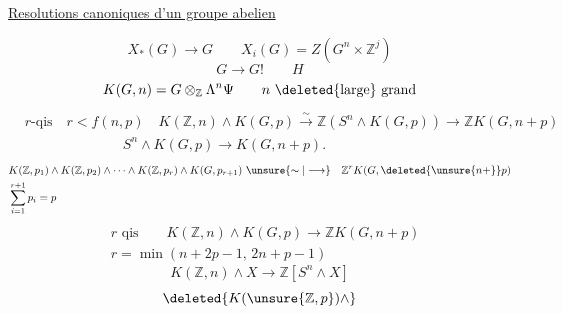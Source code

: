 \uline{Resolutions canoniques d'un groupe abelien}

\[
X_*(G)\longrightarrow G\qquad X_i(G)=Z(G^n\times\mathbb Z^j)
\]
\[
G\to G!\qquad H
\]
\[
K(G,n)=G\otimes_{\mathbb Z}\Lambda^n\Psi\qquad n\ \deleted{\text{large}}\ \text{grand}
\]
\[
\begin{aligned}
&r\text{-qis}\quad r<f(n,p)\quad K(\mathbb Z,n)\wedge K(G,p)\xrightarrow{\sim}\mathbb Z(S^n\wedge K(G,p))\longrightarrow\mathbb Z K(G,n+p)\\
&\hspace{7em} S^n\wedge K(G,p)\longrightarrow K(G,n+p).
\end{aligned}
\]
\[
\begin{aligned}
&K(\mathbb Z,p_1)\wedge K(\mathbb Z,p_2)\wedge\cdots\wedge K(\mathbb Z,p_r)\wedge K(G,p_{r+1})\ \unsure{\sim|\longrightarrow}\quad\mathbb Z^r K(G,\deleted{\unsure{n+}}p)\\
&\sum_{i=1}^{r+1}p_i=p
\end{aligned}
\]
\[
\begin{aligned}
&r\text{ qis}\qquad \boxed{K(\mathbb Z,n)\wedge K(G,p)\longrightarrow\mathbb Z K(G,n+p)}\\
&r=\min(n+2p-1,\,2n+p-1)
\end{aligned}
\]
\[
K(\mathbb Z,n)\wedge X\longrightarrow\mathbb Z[S^n\wedge X]
\]
\[
\deleted{K(\unsure{\mathbb Z,p})\wedge}
\]
